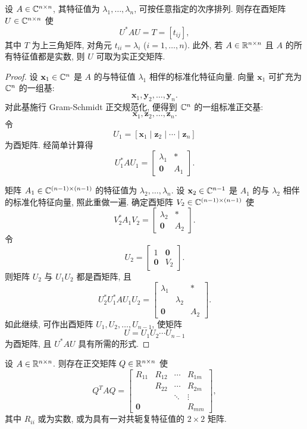 \begin{theorem}
\label{thm:7-1}
设 $A\in\mathbb{C}^{n\times n}$, 其特征值为 $\lambda_1,\ldots,\lambda_n$, 可按任意指定的次序排列. 则存在酉矩阵 $U\in\mathbb{C}^{n\times n}$ 使
\[
  U^*AU=T=[t_{ij}],
\]
其中 $T$ 为上三角矩阵, 对角元 $t_{ii}=\lambda_i$ ($i=1,\ldots,n$). 此外, 若 $A\in\mathbb{R}^{n\times n}$ 且 $A$ 的所有特征值都是实数, 则 $U$ 可取为实正交矩阵.
\end{theorem}

\begin{proof}
设 $\mathbf{x}_1\in\mathbb{C}^n$ 是 $A$ 的与特征值 $\lambda_1$ 相伴的标准化特征向量. 向量 $\mathbf{x}_1$ 可扩充为 $\mathbb{C}^n$ 的一组基:
\[
  \mathbf{x}_1,\mathbf{y}_2,\ldots,\mathbf{y}_n.
\]
对此基施行 Gram-Schmidt 正交规范化, 便得到 $\mathbb{C}^n$ 的一组标准正交基:
\[
  \mathbf{x}_1,\mathbf{z}_2,\ldots,\mathbf{z}_n.
\]
令
\[
  U_1=[\mathbf{x}_1\mid\mathbf{z}_2\mid\cdots\mid\mathbf{z}_n]
\]
为酉矩阵. 经简单计算得
\[
  U_1^*AU_1=\begin{bmatrix}
    \lambda_1 & *\\
    \mathbf{0} & A_1
  \end{bmatrix}.
\]

矩阵 $A_1\in\mathbb{C}^{(n-1)\times(n-1)}$ 的特征值为 $\lambda_2,\ldots,\lambda_n$. 设 $\mathbf{x}_2\in\mathbb{C}^{n-1}$ 是 $A_1$ 的与 $\lambda_2$ 相伴的标准化特征向量, 照此重做一遍. 确定酉矩阵 $V_2\in\mathbb{C}^{(n-1)\times(n-1)}$ 使
\[
  V_2^*A_1V_2=\begin{bmatrix}
    \lambda_2 & *\\
    \mathbf{0} & A_2
  \end{bmatrix}.
\]
令
\[
  U_2=\begin{bmatrix}
    1 & \mathbf{0}\\
    \mathbf{0} & V_2
  \end{bmatrix}.
\]
则矩阵 $U_2$ 与 $U_1U_2$ 都是酉矩阵, 且
\[
  U_2^*U_1^*AU_1U_2=\begin{bmatrix}
    \lambda_1 &          & *\\
              & \lambda_2 & \\
    \mathbf{0} &          & A_2
  \end{bmatrix}.
\]
如此继续, 可作出酉矩阵 $U_1,U_2,\ldots,U_{n-1}$, 使矩阵
\[
  U=U_1U_2\cdots U_{n-1}
\]
为酉矩阵, 且 $U^*AU$ 具有所需的形式.
\end{proof}

\begin{theorem}
\label{thm:7-2}
设 $A\in\mathbb{R}^{n\times n}$. 则存在正交矩阵 $Q\in\mathbb{R}^{n\times n}$ 使
\[
  Q^TAQ=\begin{bmatrix}
    R_{11} & R_{12} & \cdots & R_{1m}\\
           & R_{22} & \cdots & R_{2m}\\
           &        & \ddots & \vdots\\
    \mathbf{0} &   &        & R_{mm}
  \end{bmatrix},
\]
其中 $R_{ii}$ 或为实数, 或为具有一对共轭复特征值的 $2\times2$ 矩阵.
\end{theorem}

